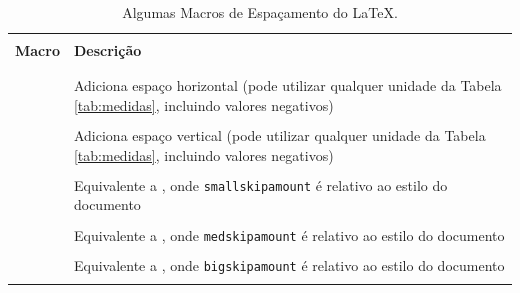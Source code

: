\begin{table}[H]
\centering
\caption{Algumas Macros de Espaçamento do \LaTeX{}.}
\label{tab:espacamentos}
    \begin{tabular}{p{3cm}p{10cm}}
    \hline
    \\[-0.5em]
    \textbf{Macro} & \textbf{Descrição} \\
    \\[-0.5em]
    \hline
    \hline
    \\[-0.5em]
    \texttt{\hspace}          & Adiciona espaço horizontal (pode utilizar qualquer unidade da Tabela \ref{tab:medidas}, incluindo valores negativos) \\
    \\[-0.5em]
    \texttt{\vspace}          & Adiciona espaço vertical (pode utilizar qualquer unidade da Tabela \ref{tab:medidas}, incluindo valores negativos)\\
    \\[-0.5em]
    \texttt{\smallskip}       & Equivalente a \texttt{\vspace{smallskipamount}}, onde {\tt smallskipamount} é relativo ao estilo do documento \\
    \\[-0.5em]
    \texttt{\medskip}         & Equivalente a \texttt{\vspace{medskipamount}}, onde {\tt medskipamount} é relativo ao estilo do documento \\
    \\[-0.5em]
    \texttt{\bigskip}         & Equivalente a \texttt{\vspace{bigskipamount}}, onde {\tt bigskipamount} é relativo ao estilo do documento \\
    \\[-0.5em]
    \hline
    \end{tabular}
\end{table}


%

